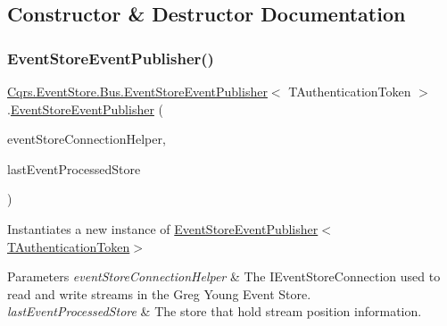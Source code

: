 \subsection{Constructor \& Destructor Documentation}
\mbox{\label{classCqrs_1_1EventStore_1_1Bus_1_1EventStoreEventPublisher_a4ca16479fe387fae0135865ae3f889d7_a4ca16479fe387fae0135865ae3f889d7}} 
\subsubsection{\texorpdfstring{Event\+Store\+Event\+Publisher()}{EventStoreEventPublisher()}}
{\footnotesize\ttfamily \hyperlink{classCqrs_1_1EventStore_1_1Bus_1_1EventStoreEventPublisher}{Cqrs.\+Event\+Store.\+Bus.\+Event\+Store\+Event\+Publisher}$<$ T\+Authentication\+Token $>$.\hyperlink{classCqrs_1_1EventStore_1_1Bus_1_1EventStoreEventPublisher}{Event\+Store\+Event\+Publisher} (\begin{DoxyParamCaption}\item[{\hyperlink{interfaceCqrs_1_1EventStore_1_1IEventStoreConnectionHelper}{I\+Event\+Store\+Connection\+Helper}}]{event\+Store\+Connection\+Helper,  }\item[{\hyperlink{interfaceCqrs_1_1Bus_1_1IStoreLastEventProcessed}{I\+Store\+Last\+Event\+Processed}}]{last\+Event\+Processed\+Store }\end{DoxyParamCaption})}



Instantiates a new instance of \hyperlink{classCqrs_1_1EventStore_1_1Bus_1_1EventStoreEventPublisher_a4ca16479fe387fae0135865ae3f889d7_a4ca16479fe387fae0135865ae3f889d7}{Event\+Store\+Event\+Publisher$<$\+T\+Authentication\+Token$>$} 


\begin{DoxyParams}{Parameters}
{\em event\+Store\+Connection\+Helper} & The I\+Event\+Store\+Connection used to read and write streams in the Greg Young Event Store.\\
\hline
{\em last\+Event\+Processed\+Store} & The store that hold stream position information.\\
\hline
\end{DoxyParams}



